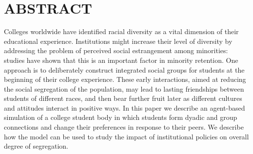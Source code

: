 
\section*{ABSTRACT}

Colleges worldwide have identified racial diversity as a vital dimension of
their educational experience. Institutions might increase their level of
diversity by addressing the problem of perceived social estrangement among
minorities: studies have shown that this is an important factor in minority
retention. One approach is to deliberately construct integrated social groups
for students at the beginning of their college experience. These early
interactions, aimed at reducing the social segregation of the population, may
lead to lasting friendships between students of different races, and then bear
further fruit later as different cultures and attitudes interact in positive
ways. In this paper we describe an agent-based simulation of a college student
body in which students form dyadic and group connections and change their
preferences in response to their peers. We describe how the model can be used
to study the impact of institutional policies on overall degree of
segregation.
